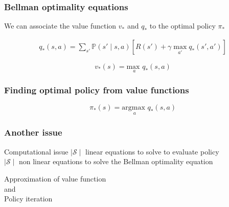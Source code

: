 \documentclass[dvipsnames,svgnames]{beamer}
\begin{document}
\begin{frame}
\frametitle{Bellman optimality equations}

We can associate the value function $v_*$ and $q_*$ to the optimal policy $\pi_{*}$   


\begin{block}{}
\begin{equation*}
\begin{split}
q_{*}(s,a) = \sum_{s'}\mathbb{P}(s' \mid s,a)\left[R(s')+\gamma \max_{a'}q_{*}(s',a')\right]
\end{split}
\end{equation*}
\end{block}

\begin{block}{}


\begin{equation*}
v_{*}(s)=\underset{a}{\text{max }} q_{*}(s,a)
\end{equation*}
\end{block}



\end{frame}


\begin{frame}
\frametitle{Finding optimal policy from value functions}
\begin{block}{}

$$\pi_{*}(s)= \underset{a}{\text{argmax }}q_*(s,a)$$
\end{block}
\end{frame}

\begin{frame}
\frametitle{Another issue}
\begin{alertblock}{Computational issue}
$\mid \mathcal{S} \mid $ linear equations to solve to evaluate policy\\
$\mid \mathcal{S} \mid $ non linear equations to solve the Bellman optimality equation 
\end{alertblock}

\pause 
\vspace{1cm}
\centering
Approximation of value function
\\ and
\\Policy iteration

\end{frame}
\end{document}
